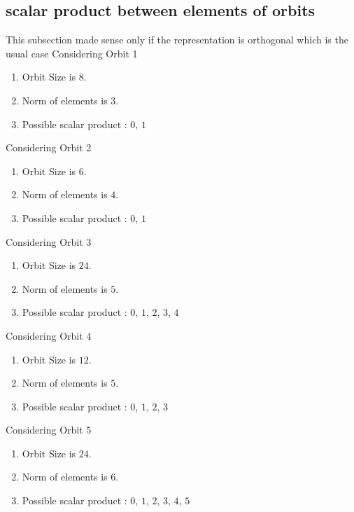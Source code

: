 \documentclass[12pt]{article}
\begin{document}
\subsection{scalar product between elements of orbits}
\noindent This subsection made sense only if the representation is orthogonal which is the usual case
Considering Orbit 1
\begin{enumerate}
\item Orbit Size is $8$.
\item Norm of elements is $3$.
\item Possible scalar product : $0$, $1$
\end{enumerate}
Considering Orbit 2
\begin{enumerate}
\item Orbit Size is $6$.
\item Norm of elements is $4$.
\item Possible scalar product : $0$, $1$
\end{enumerate}
Considering Orbit 3
\begin{enumerate}
\item Orbit Size is $24$.
\item Norm of elements is $5$.
\item Possible scalar product : $0$, $1$, $2$, $3$, $4$
\end{enumerate}
Considering Orbit 4
\begin{enumerate}
\item Orbit Size is $12$.
\item Norm of elements is $5$.
\item Possible scalar product : $0$, $1$, $2$, $3$
\end{enumerate}
Considering Orbit 5
\begin{enumerate}
\item Orbit Size is $24$.
\item Norm of elements is $6$.
\item Possible scalar product : $0$, $1$, $2$, $3$, $4$, $5$
\end{enumerate}
\end{document}
